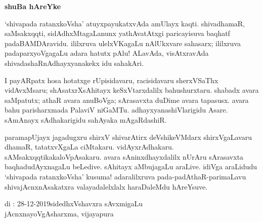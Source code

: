 \begin{center}
{\Huge\bfseries shuBa hAreYke}
\end{center}

\bigskip

`shivapada ratanxkoVsha' atuyxpayukatxvAda amUlayx kaqti. shivadhamaR, saMsakxqqti, sidAdhxMtagaLanunx yathAvatAtxgi paricayisuva baqhatf padaBAMDAravidu. ililxruva ulelxVKagaLu nAlUkxvare sahasarx; ililxruva padaparxyoVgagaLu adara hatutx pAlu! ALavAda, visAtxravAda shivadashaRnAdhayxyanakekx idu sahakAri.

\medskip

I payARpatx hosa hotatxge rUpisidavaru, racisidavaru sherxVSaThx vidAvxMsaru; shAsatxrXsAhitayx keSxVtarxdalilx bahushurxtaru. shabadx avara saMpatutx; athaR avara anuBoVga; sArasavxta duDime avara tapasusx. avara bahu parisharxmada PalaviV niGaMTu. adhayxyana\-shiVlarigidu Asare. sAmAnayx sAdhakarigidu sahAyaka mAgaRdashiR.

\medskip

paramapUjayx jagadugxru shirxV shivarAtirx deVshikeVMdarx shirxVgaLavaru dhamaR, tatatxvXgaLa ciMtakaru. vidAyxrAdhakaru. sAMsakxqqtika\break kaloVpAsakaru. avara sAninxdhayxdalilx nUrAru sArasavxta baqhadudAyxnagaLu beLedive. sAhitayx aMbujagaLu araLive. idiVga araLidudu `shivapada ratanxkoVsha' kusuma! adaralilxruva pada-padAthaR-parimaLavu shivajAcnxnAsakatxra valayadalelxlalx haraDaleMdu hAreYsuve.

\vskip 1.5cm

\noindent
di : 28-12-2019\hfill sidedhxVshavxra sAvxmigaLu\qquad\,\\
\phantom{a} \hfill jAcnxnayoVgAsharxma, vijayapura
